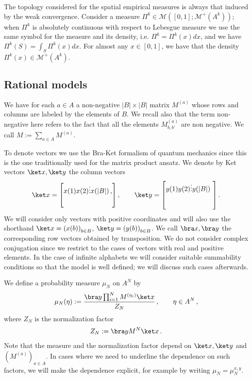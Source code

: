 \documentclass[reqno]{amsart}
\theoremstyle{plain}
\theoremstyle{definition}
\theoremstyle{remark}
\numberwithin{equation}{section}
\numberwithin{theorem}{section}
\def\\{\par\medskip}
\newcommand{\<}{\langle}
\renewcommand{\>}{\rangle}
\begin{document}
	The topology considered for the spatial empirical measures is always that induced by the weak convergence. Consider a measure $\Pi^k\in \mathcal M([0,1]; \mathcal M^+(A^k))$; when $\Pi^k$ is absolutely continuous with respect to Lebesgue measure we use the same symbol for the measure and its density, i.e. $\Pi^k=\Pi^k(x)dx$, and we have $\Pi^k(S)=\int_S\Pi^k(x)dx$. For almost any $x\in[0,1]$, we have that the density $\Pi^k(x)\in \mathcal M^+(A^k)$.
	
	\subsection{Rational models}
	
	We have for each $a\in A$ a non-negative $|B|\times|B|$ matrix $M^{(a)}$ whose rows and columns are labeled by the elements of $B$. We recall also that the term non-negative here refers to the fact that all the elements $M^{(a)}_{b,b'}$ are non negative. We call $M:=\sum_{a\in A} M^{(a)}$. 
	
	To denote vectors we use the Bra-Ket formalism of quantum mechanics since this is the one traditionally used for the matrix product ansatz.
	We denote by Ket vectors $\ket x, \ket y$ the column vectors
	$$
	\ket x=\begin{bmatrix} x(1) \\ x(2) \\ \vdots \\ x(|B|)\,,
	\end{bmatrix}, \qquad \ket y=\begin{bmatrix} y(1) \\ y(2) \\ \vdots \\ y(|B|)\ \\ 
	\end{bmatrix}.
	$$ 
	We will consider only vectors with positive coordinates and will also use the shorthand $\ket x=\left(x(b)\right)_{b\in B}$, $\ket y=\left(y(b)\right)_{b\in B}$.  We call $\bra x,\bra y$ the corresponding row vectors obtained by transposition. We do not consider complex conjugation since we restrict to the cases of vectors with real and positive elements. In the case of infinite alphabets we will consider suitable summability conditions so that the model is well defined; we will discuss such cases afterwards. 
	
	We define a probability measure $\mu_N$ on $A^N$ by
	\begin{equation}\label{inv-rational}
		\mu_N( \eta):=\frac{\bra y\prod_{i=1}^NM^{(\eta_i)}\ket x}{Z_N}\,,\qquad \eta\in A^N\,,
	\end{equation}
	where $Z_N$ is the normalization factor
	\begin{equation}
		Z_N:=\bra y  M^N \ket x\,.
	\end{equation}
	Note that the measure and the  normalization factor depend on $\ket x,\ket y$ and $(M^{(a)})_{a\in A}$. In cases where we need to underline the dependence on such factors, we will make the dependence explicit, for example by writing $\mu_N=\mu_N^{x,y}$.
	
\end{document}
